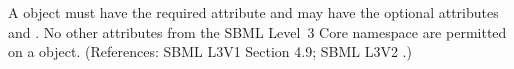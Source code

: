 A \RateRule object must have the required attribute  and
may have the optional attributes  and .  No
other attributes from the SBML Level~3 Core namespace are permitted on a
\RateRule object.  (References: SBML L3V1 Section 4.9; SBML L3V2 .)
